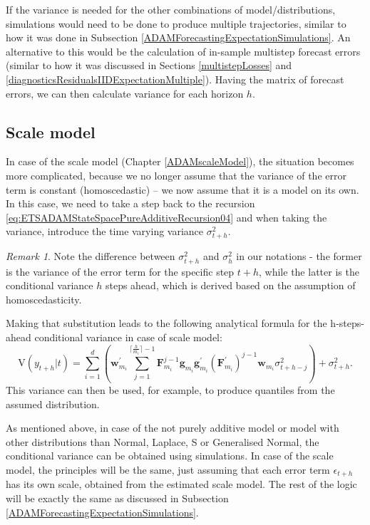 \documentclass[
]{book}
\theoremstyle{definition}
\theoremstyle{definition}
\theoremstyle{definition}
\theoremstyle{definition}
\theoremstyle{remark}
\newtheorem*{remark}{Remark}
\begin{document}
If the variance is needed for the other combinations of model/distributions, simulations would need to be done to produce multiple trajectories, similar to how it was done in Subsection \ref{ADAMForecastingExpectationSimulations}. An alternative to this would be the calculation of in-sample multistep forecast errors (similar to how it was discussed in Sections \ref{multistepLosses} and \ref{diagnosticsResidualsIIDExpectationMultiple}). Having the matrix of forecast errors, we can then calculate variance for each horizon \(h\).

\hypertarget{scale-model}{%
\subsection{Scale model}\label{scale-model}}

In case of the scale model (Chapter \ref{ADAMscaleModel}), the situation becomes more complicated, because we no longer assume that the variance of the error term is constant (homoscedastic) -- we now assume that it is a model on its own. In this case, we need to take a step back to the recursion \eqref{eq:ETSADAMStateSpacePureAdditiveRecursion04} and when taking the variance, introduce the time varying variance \(\sigma_{t+h}^2\).

\begin{remark}
Note the difference between \(\sigma_{t+h}^2\) and \(\sigma_{h}^2\) in our notations - the former is the variance of the error term for the specific step \(t+h\), while the latter is the conditional variance \(h\) steps ahead, which is derived based on the assumption of homoscedasticity.
\end{remark}

Making that substitution leads to the following analytical formula for the h-steps-ahead conditional variance in case of scale model:
\begin{equation}
    \text{V}(y_{t+h}|t) = \sum_{i=1}^d \left(\mathbf{w}_{m_i}^\prime \sum_{j=1}^{\lceil\frac{h}{m_i}\rceil-1} \mathbf{F}_{m_i}^{j-1} \mathbf{g}_{m_i} \mathbf{g}^\prime_{m_i} (\mathbf{F}_{m_i}^\prime)^{j-1} \mathbf{w}_{m_i} \sigma_{t+h-j}^2 \right) + \sigma_{t+h}^2 .
    \label{eq:ETSADAMFullWithScaleModelVariance}
\end{equation}
This variance can then be used, for example, to produce quantiles from the assumed distribution.

As mentioned above, in case of the not purely additive model or model with other distributions than Normal, Laplace, S or Generalised Normal, the conditional variance can be obtained using simulations. In case of the scale model, the principles will be the same, just assuming that each error term \(\epsilon_{t+h}\) has its own scale, obtained from the estimated scale model. The rest of the logic will be exactly the same as discussed in Subsection \ref{ADAMForecastingExpectationSimulations}.
\end{document}
